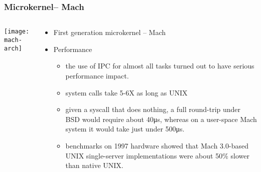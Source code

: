 \begin{frame}[plain]
	\frametitle{Microkernel-- Mach}
	
	
	\begin{columns}
		
		\begin{column}{.4\textwidth}
			\centering
			\texttt{[image: mach-arch]}
		\end{column}
		
		\begin{column}{.6\textwidth}
			
			\begin{itemize}
				\item First generation microkernel -- Mach 
				\item Performance
				\begin{itemize}
					\item the use of IPC for almost all tasks turned out to have serious performance impact. 
					\item system calls take 5-6X as long as UNIX
					\item  given a syscall that does nothing, a full round-trip under BSD would require about 40μs, whereas on a user-space Mach system it would take just under 500μs. 

					\item benchmarks on 1997 hardware showed that Mach 3.0-based UNIX single-server implementations were about 50\% slower than native UNIX.
				\end{itemize}		
			\end{itemize}	
			
		\end{column}
		
		
	\end{columns}
	
\end{frame}




